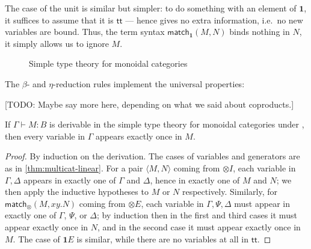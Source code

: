 \documentclass{book}
\let\types\vdash
\def\type{\;\ftype}
\def\ttt{\mathsf{tt}}
\def\pair#1#2{\langle #1,#2\rangle}
\def\match{\mathsf{match}}
\def\one{\mathbf{1}}
\let\tensor\otimes
\def\tensorI{\mathord{\tensor}I}
\def\tensorE{\mathord{\tensor}E}
\begin{document}
The case of the unit is similar but simpler: to do something with an element of $\one$, it suffices to assume that it is $\ttt$ --- hence gives no extra information, i.e.\ no new variables are bound.
Thus, the term syntax $\match_\one(M,N)$ binds nothing in $N$, it simply allows us to ignore $M$.

\begin{figure}
  \centering
  \caption{Simple type theory for monoidal categories}
  \label{fig:moncat}
\end{figure}

The $\beta$- and $\eta$-reduction rules implement the universal properties:
[TODO: Maybe say more here, depending on what we said about coproducts.]

\begin{lem}\label{thm:moncat-linear}
  If $\Gamma\types M:B$ is derivable in the simple type theory for monoidal categories under \cG, then every variable in $\Gamma$ appears exactly once in $M$.
\end{lem}
\begin{proof}
  By induction on the derivation.
  The cases of variables and generators are as in \cref{thm:multicat-linear}.
  For a pair $\pair M N$ coming from $\tensorI$, each variable in $\Gamma,\Delta$ appears in exactly one of $\Gamma$ and $\Delta$, hence in exactly one of $M$ and $N$; we then apply the inductive hypotheses to $M$ or $N$ respectively.
  Similarly, for $\match_\tensor(M,xy.N)$ coming from $\tensorE$, each variable in $\Gamma,\Psi,\Delta$ must appear in exactly one of $\Gamma$, $\Psi$, or $\Delta$; by induction then in the first and third cases it must appear exactly once in $N$, and in the second case it must appear exactly once in $M$.
  The case of $\one E$ is similar, while there are no variables at all in $\ttt$.
\end{proof}
\end{document}
